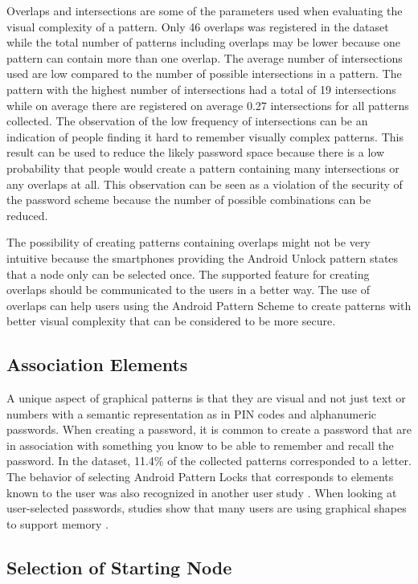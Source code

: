       Overlaps and intersections are some of the parameters used when evaluating the visual complexity of a pattern. Only 46 overlaps was registered in the dataset while the total number of patterns including overlaps may be lower because one pattern can contain more than one overlap. The average number of intersections used are low compared to the number of possible intersections in a pattern. The pattern with the highest number of intersections had a total of 19 intersections while on average there are registered on average 0.27 intersections for all patterns collected. The observation of the low frequency of intersections can be an indication of people finding it hard to remember visually complex patterns. This result can be used to reduce the likely password space because there is a low probability that people would create a pattern containing many intersections or any overlaps at all. This observation can be seen as a violation of the security of the password scheme because the number of possible combinations can be reduced. 

      The possibility of creating patterns containing overlaps might not be very intuitive because the smartphones providing the Android Unlock pattern states that a node only can be selected once. The supported feature for creating overlaps should be communicated to the users in a better way. The use of overlaps can help users using the Android Pattern Scheme to create patterns with better visual complexity that can be considered to be more secure.
    
    \clearpage
    \subsection{Association Elements}
      A unique aspect of graphical patterns is that they are visual and not just text or numbers with a semantic representation as in PIN codes and alphanumeric passwords. When creating a password, it is common to create a password that are in association with something you know to be able to remember and recall the password. In the dataset, 11.4\% of the collected patterns corresponded to a letter. The behavior of selecting Android Pattern Locks that corresponds to elements known to the user was also recognized in another user study \cite{Sun}. When looking at user-selected passwords, studies show that many users are using graphical shapes to support memory \cite{Weiss}.

    \subsection{Selection of Starting Node}


